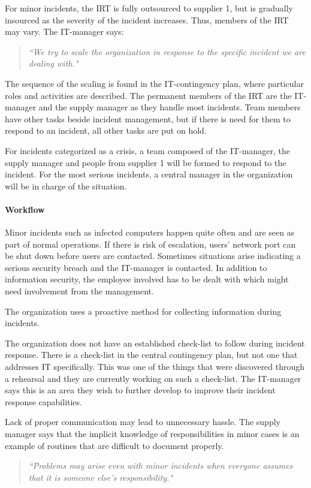 For minor incidents, the \ac{IRT} is fully outsourced to supplier 1, but is gradually insourced as the severity of the incident increases. Thus, members of the \ac{IRT} may vary. The IT-manager says:
\begin{quote}
\textit{``We try to scale the organization in response to the specific incident we are dealing with."}
\end{quote}

The sequence of the scaling is found in the IT-contingency plan, where particular roles and activities are described. The permanent members of the \ac{IRT} are the IT-manager and the supply manager as they handle most incidents. Team members have other tasks beside incident management, but if there is need for them to respond to an incident, all other tasks are put on hold.

For incidents categorized as a crisis, a team composed of the IT-manager, the supply manager and people from supplier 1 will be formed to respond to the incident. For the most serious incidents, a central manager in the organization will be in charge of the situation.

\paragraph{Workflow}
Minor incidents such as infected computers happen quite often and are seen as part of normal operations. If there is risk of escalation, users' network port can be shut down before users are contacted. Sometimes situations arise indicating a serious security breach and the IT-manager is contacted. In addition to information security, the employee involved has to be dealt with which might need involvement from the management.



The organization uses a proactive method for collecting information during incidents. %

The organization does not have an established check-list to follow during incident response. There is a check-list in the central contingency plan, but not one that addresses IT specifically. This was one of the things that were discovered through a rehearsal and they are currently working on such a check-list. The IT-manager says this is an area they wish to further develop to improve their incident response capabilities. 

Lack of proper communication may lead to unnecessary hassle. The supply manager says that the implicit knowledge of responsibilities in minor cases is an example of routines that are difficult to document properly.
\begin{quote}
\textit{``Problems may arise even with minor incidents when everyone assumes that it is someone else's responsibility."}
\end{quote}

